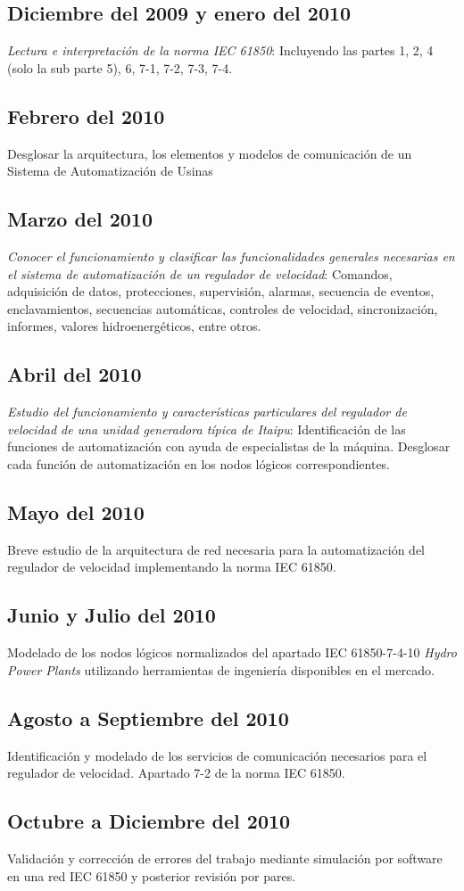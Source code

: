 	\subsection{Diciembre del 2009 y enero del 2010}	
		\emph{Lectura e interpretaci\'on de 
		la norma IEC  61850}: Incluyendo las 
		partes 1, 2, 4 (solo la sub 
		parte 5), 6, 7-1, 7-2, 7-3, 7-4.
	\subsection{Febrero del 2010}
			{Desglosar la arquitectura, 
			los elementos y modelos de comunicaci\'on 
			de un Sistema de Automatizaci\'on de Usinas}
	\subsection{Marzo del 2010}
		\emph{Conocer el funcionamiento y clasificar las 
		funcionalidades  generales necesarias en el 
		sistema de automatizaci\'on de un regulador 
		de velocidad}: Comandos, adquisici\'on de datos, 
		protecciones, supervisi\'on, alarmas, 
		secuencia de eventos, enclavamientos, 
		secuencias autom\'aticas, controles de 
		velocidad, sincronizaci\'on, informes, 
		valores hidroenerg\'eticos, entre otros.
	\subsection{Abril del 2010}
		\emph{Estudio del funcionamiento y 
		caracter\'isticas particulares del 
		regulador de velocidad de una unidad 
		generadora t\'ipica de Itaipu}: 
		Identificaci\'on de las funciones de 
		automatizaci\'on con ayuda de especialistas 
		de la m\'aquina. Desglosar cada 
		funci\'on de automatizaci\'on en los 
		nodos l\'ogicos correspondientes.
	\subsection{Mayo del 2010}
		Breve estudio de la arquitectura de red 
		necesaria para la automatizaci\'on del 
		regulador de velocidad implementando la norma IEC 61850.
	\subsection{Junio y Julio del 2010}
		Modelado de los nodos l\'ogicos 
		normalizados del apartado 
		IEC 61850-7-4-10 \emph{Hydro Power Plants} utilizando 
		herramientas de ingenier\'ia disponibles en el mercado.
	\subsection{Agosto a Septiembre del 2010}
		Identificaci\'on y modelado de los servicios 
		de comunicaci\'on necesarios para el regulador 
		de velocidad. Apartado 7-2 de la norma IEC 61850.
	\subsection{Octubre a Diciembre del 2010}
			Validaci\'on y correcci\'on de errores del 
			trabajo mediante simulaci\'on por software 
			en una red IEC 61850 y posterior revisi\'on por pares.

